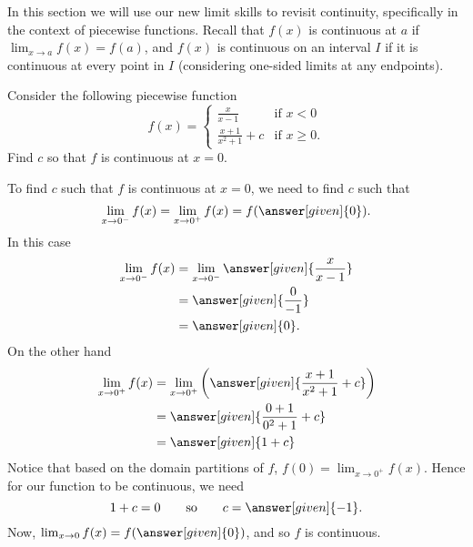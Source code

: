 \documentclass{ximera}
\begin{document}


In this section we will use our new limit skills to revisit continuity, specifically in the context of piecewise functions. Recall that $f(x)$ is continuous at $a$ if $\displaystyle\lim_{x\rightarrow a}f(x)=f(a)$, and $f(x)$ is continuous on an interval $I$ if it is continuous at every point in $I$ (considering one-sided limits at any endpoints).

\begin{example}
Consider the following piecewise function
\[
f(x) = 
\begin{cases}
  \frac{x}{x-1} &\text{if $x<0$}\\
  \frac{x+1}{x^2+1} + c &\text{if $x\ge 0$}.
\end{cases}
\]
Find $c$ so that $f$ is continuous at $x=0$.
\begin{explanation}
  To find $c$ such that $f$ is continuous at $x=0$, we need to find
  $c$ such that
  \[
  \lim_{x\to 0^-} f(x) = \lim_{x\to 0^+}f(x) = f(\answer[given]{0}).
  \]
  In this case
  \begin{align*}
    \lim_{x\to 0^-} f(x) &= \lim_{x\to 0^-}\answer[given]{\frac{x}{x-1}}\\
    &= \answer[given]{\frac{0}{-1}}\\
    &=\answer[given]{0}.
  \end{align*}
  On the other hand
  \begin{align*}
    \lim_{x\to 0^+} f(x) &= \lim_{x\to 0^+}\left(\answer[given]{\frac{x+1}{x^2+1} + c}\right)\\
    &= \answer[given]{\frac{0+1}{0^2+1} + c}\\
    &= \answer[given]{1+ c}
  \end{align*}
 Notice that based on the domain partitions of $f$, $f(0)=\lim_{x\to 0^+} f(x)$. Hence for our function to be continuous, we need
  \[
  1 + c = 0\qquad\text{so}\qquad c = \answer[given]{-1}.
  \]
  Now, $\lim_{x\to 0} f(x) = f(\answer[given]{0})$, and so $f$ is continuous.
\end{explanation}
\end{example}
\end{document}
